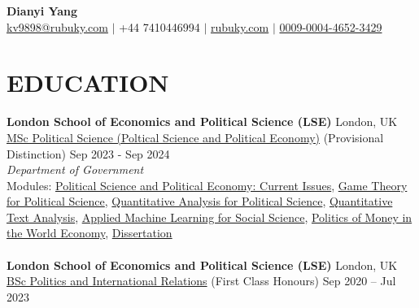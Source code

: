 \documentclass[a4paper,9pt]{extarticle}
\begin{document}
\pagestyle{empty}

\begin{center}
\textbf{\huge Dianyi Yang}\\[2pt] %
\label{CV}
\href{mailto:kv9898@rubuky.com}{kv9898@rubuky.com} $\mid$ +44 7410446994 $\mid$ \href{https://www.rubuky.com/}{rubuky.com} $\mid$ \href{https://orcid.org/0009-0004-4652-3429}{0009-0004-4652-3429} %
\end{center}

\section*{EDUCATION}
\noindent
\textbf{London School of Economics and Political Science (LSE)} \hfill London, UK \\ \href{https://www.lse.ac.uk/resources/calendar2023-2024/programmeRegulations/taughtMasters/2023/MScPoliticalSciencePoliticalScienceAndPoliticalEconomy.htm}{MSc Political Science (Poltical Science and Political Economy)}  (Provisional Distinction)  \hfill Sep 2023 - Sep 2024\\ %
\textit{Department of Government}\vspace{0.1cm}\\ %
Modules: \href{https://www.lse.ac.uk/resources/calendar2023-2024/courseGuides/GV/2023_GV482.htm}{Political Science and Political Economy: Current Issues}, \href{https://www.lse.ac.uk/resources/calendar2023-2024/courseGuides/GV/2023_GV4C8.htm}{Game Theory for Political Science}, \href{https://www.lse.ac.uk/resources/calendar2023-2024/courseGuides/GV/2023_GV481.htm}{Quantitative Analysis for Political Science}, \href{https://www.lse.ac.uk/resources/calendar2023-2024/courseGuides/MY/2023_MY459.htm}{Quantitative Text Analysis}, \href{https://www.lse.ac.uk/resources/calendar2023-2024/courseGuides/MY/2023_MY474.htm}{Applied Machine Learning for Social Science}, 
\href{https://www.lse.ac.uk/resources/calendar2023-2024/courseGuides/IR/2023_IR469.htm}{Politics of Money in the World Economy}, \href{https://www.lse.ac.uk/resources/calendar2023-2024/courseGuides/GV/2023_GV499.htm}{Dissertation}
\\~\\
\noindent
\textbf{London School of Economics and Political Science (LSE)} \hfill London, UK \\ \href{https://www.lse.ac.uk/resources/calendar2023-2024/programmeRegulations/undergraduate/2020/BScPoliticsAndInternationalRelations.htm}{BSc Politics and International Relations} (First Class Honours) \hfill Sep 2020 – Jul 2023 \\
\end{document}
